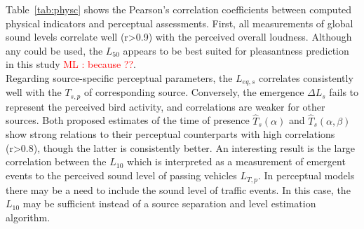 \documentclass[11pt,a4paper]{article}
\newcommand{\ml}[1]{\textcolor{red}{ML : #1}}
\begin{document}
Table~\ref{tab:physc} shows the Pearson's correlation coefficients between computed physical indicators and perceptual assessments. First, all measurements of global sound levels correlate well (r>0.9) with the perceived overall loudness. Although any could be used, the $L_{50}$ appears to be best suited for pleasantness prediction in this study \ml{because ??}.\\

Regarding source-specific perceptual parameters, the $L_{eq, s}$ correlates consistently well with the $T_{s, p}$ of corresponding source. Conversely, the emergence $\Delta L_s$ fails to represent the perceived bird activity, and correlations are weaker for other sources. Both proposed estimates of the time of presence $\hat T_s(\alpha)$ and $\hat T_s(\alpha, \beta)$ show strong relations to their perceptual counterparts with high correlations (r>0.8), though the latter is consistently better. An interesting result is the large correlation between the $L_{10}$ which is interpreted as a measurement of emergent events to the perceived sound level of passing vehicles $L_{T, p}$. In perceptual models there may be a need to include the sound level of traffic events. In this case, the $L_{10}$ may be sufficient instead of a source separation and level estimation algorithm.\\
\end{document}
